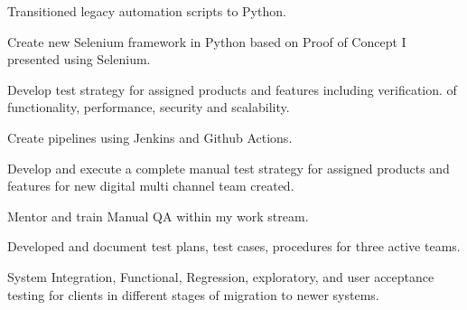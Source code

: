 \documentclass[]{deedy-resume-openfont}
\begin{document}
\begin{minipage}[t]{0.66\textwidth}
\begin{tightemize}
\item Transitioned legacy automation scripts to Python.
\end{tightemize}
\sectionsep
{}
\vspace{\topsep} %
\begin{tightemize}
\item Create new Selenium framework in Python based on Proof of Concept I presented using Selenium.
\item Develop test strategy for assigned products and features including verification.
of functionality, performance, security and scalability.
\item Create pipelines using Jenkins and Github Actions.
\end{tightemize}
\sectionsep
{}
\vspace{\topsep} %
\begin{tightemize}
\item Develop and execute a complete manual test strategy for assigned products and features for new digital multi channel team created.
\item Mentor and train Manual QA within my work stream.
\end{tightemize}
\sectionsep
{}
\begin{tightemize}
\item Developed and document test plans, test cases, procedures for three active teams.
\item System Integration, Functional, Regression, exploratory, and user acceptance testing for clients in different stages of migration to newer systems.
\end{tightemize}
\end{minipage}
\end{document}
